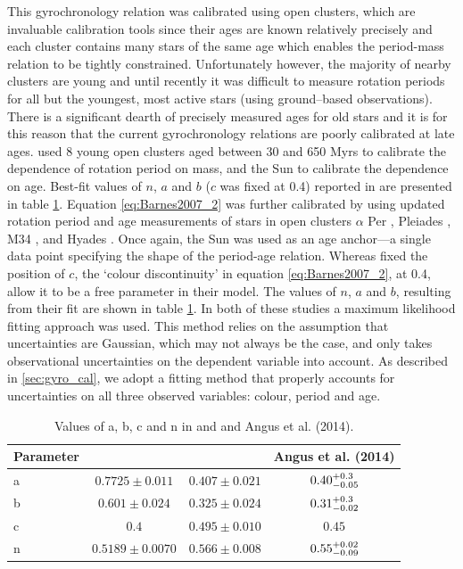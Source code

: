 This gyrochronology relation was calibrated using open clusters, which are
invaluable calibration tools since their ages are known relatively precisely
and each cluster contains many stars of the same age which enables the
period-mass relation to be tightly constrained.
Unfortunately however, the majority of nearby clusters are young and until
recently it was difficult to measure rotation periods for all but the
youngest, most active stars (using ground--based observations).
There is a significant dearth of precisely measured ages for old stars and it
is for this reason that the current gyrochronology relations are poorly
calibrated at late ages.
\citet{Barnes2007} used 8 young open clusters aged between 30 and 650 Myrs to
calibrate the dependence of rotation period on mass, and the Sun to calibrate
the dependence on age.
Best-fit values of $n$, $a$ and $b$ ($c$ was fixed at 0.4) reported in
\citet{Barnes2007} are presented in table \ref{tab:constants}.
Equation \ref{eq:Barnes2007_2} was further calibrated by \citet{Mamajek2008}
using updated rotation period and age measurements of stars in open clusters
$\alpha$ Per \citep{Prosser1995}, Pleiades \citep{Prosser1995,
Krishnamurthi1998}, M34 \citep{Meibom2011_M34}, and Hyades \citep[Henry,
private comm.,][]{Radick1987, Radick1995, Prosser1995, Paulson2004}.
Once again, the Sun was used as an age anchor---a single data point specifying
the shape of the period-age relation.
Whereas \citet{Barnes2007} fixed the position of $c$, the `colour
discontinuity' in equation \ref{eq:Barnes2007_2}, at 0.4, \citet{Mamajek2008}
allow it to be a free parameter in their model.
The values of $n$, $a$ and $b$, resulting from their fit are shown in table
\ref{tab:constants}.
In both of these studies a maximum likelihood fitting approach was used.
This method relies on the assumption that uncertainties are Gaussian, which
may not always be the case, and only takes observational uncertainties on the
dependent variable into account.
As described in \textsection \ref{sec:gyro_cal}, we adopt a fitting method
that properly accounts for uncertainties on all three observed variables:
colour, period and age.

\begin{table}
\caption[Gyrochronology results.]
{Values of a, b, c and n in \citet{Barnes2007} and
    \citet{Mamajek2008} and Angus et al. (2014). \label{tab:constants}}
\begin{tabular}{lccc}
\hline\hline
    Parameter & \citet{Barnes2007} & \citet{Mamajek2008} & Angus et al. (2014) \\
    \hline
    a & $0.7725 \pm 0.011$ & $0.407 \pm 0.021$ & $0.40^{+0.3}_{-0.05}$ \\
    b & $0.601 \pm 0.024$ & $0.325 \pm 0.024$ & $0.31^{+0.3}_{-0.02}$\\
    c & $0.4$ & $0.495 \pm 0.010$ & $0.45$ \\
    n & $0.5189 \pm 0.0070$ & $0.566 \pm 0.008$ & $0.55^{+0.02}_{-0.09}$\\
\hline
\end{tabular}
\end{table}

